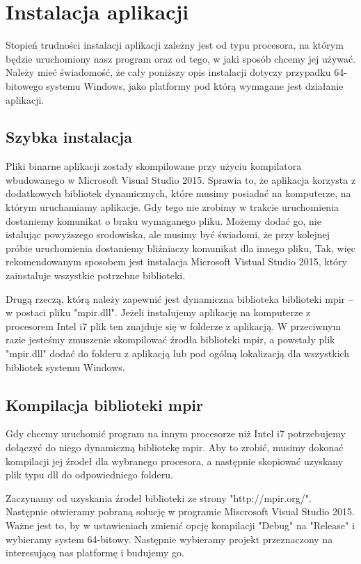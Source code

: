 \documentclass[twoside,a4paper]{book}
\begin{document}
\section{Instalacja aplikacji}

Stopień trudności instalacji aplikacji zależny jest od typu procesora, na którym będzie uruchomiony nasz program oraz od tego, w jaki sposób chcemy jej używać. Należy mieć świadomość, że cały poniższy opis instalacji dotyczy przypadku 64-bitowego systemu Windows, jako platformy pod którą wymagane jest działanie aplikacji.

\subsection{Szybka instalacja}

Pliki binarne aplikacji zostały skompilowane przy użyciu kompilatora wbudowanego w Microsoft Visual Studio 2015. Sprawia to, że aplikacja korzysta z dodatkowych bibliotek dynamicznych, które musimy posiadać na komputerze, na którym uruchamiamy aplikacje. Gdy tego nie zrobimy w trakcie uruchomienia dostaniemy komunikat o braku wymaganego pliku.
Możemy dodać go, nie istalując powyższego srodowiska, ale musimy być świadomi, że przy kolejnej próbie uruchomienia dostaniemy bliźniaczy komunikat dla innego pliku, Tak, więc rekomendowanym sposobem jest instalacja Microsoft Vistual Studio 2015, który zainstaluje wszystkie potrzebne biblioteki.

Drugą rzeczą, którą należy zapewnić jest dynamiczna biblioteka biblioteki mpir -- w postaci pliku "mpir.dll". Jeżeli instalujemy aplikację na komputerze z procesorem Intel i7 plik ten znajduje się w folderze z aplikacją. W przeciwnym razie jesteśmy zmuszenie skompilować źrodła biblioteki mpir, a powstały plik "mpir.dll" dodać do folderu z aplikacją lub pod ogólną lokalizacją dla wszystkich bibliotek systemu Windows.

\subsection{Kompilacja biblioteki mpir}

Gdy chcemy uruchomić program na innym procesorze niż Intel i7 potrzebujemy dołączyć do niego dynamiczną bibliotekę mpir. Aby to zrobić, musimy dokonać kompilacji jej źrodeł dla wybranego procesora, a następnie skopiować uzyskany plik typu dll do odpowiedniego folderu.

Zaczynamy od uzyskania źrodeł biblioteki ze strony "http://mpir.org/". Następnie otwieramy pobraną solucję w programie Miscrosoft Visual Studio 2015. Ważne jest to, by w ustawieniach zmienić opcję kompilacji "Debug" na "Release" i wybieramy system 64-bitowy. Następnie wybieramy projekt przeznaczony na interesującą nas platformę i budujemy go.
\end{document}

